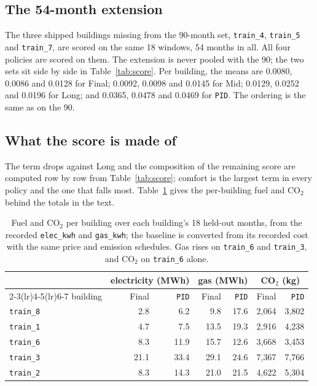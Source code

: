 \documentclass{article}
\begin{document}
\subsection{The 54-month extension}
\label{app:extension}

The three shipped buildings missing from the 90-month set, \texttt{train\_4}, \texttt{train\_5} and \texttt{train\_7}, are scored on the same 18 windows, 54 months in all. All four policies are scored on them. The extension is never pooled with the 90; the two sets sit side by side in Table~\ref{tab:score}. Per building, the means are 0.0080, 0.0086 and 0.0128 for Final; 0.0092, 0.0098 and 0.0145 for Mid; 0.0129, 0.0252 and 0.0196 for Long; and 0.0365, 0.0478 and 0.0469 for \texttt{PID}. The ordering is the same as on the 90.

\subsection{What the score is made of}
\label{app:fuel}

The term drops against Long and the composition of the remaining score are computed row by row from Table~\ref{tab:score}; comfort is the largest term in every policy and the one that falls most. Table~\ref{tab:app_fuel} gives the per-building fuel and CO$_2$ behind the totals in the text.

\begin{table}[h!]
\centering
\small
\begin{tabular}{@{}lrrrrrr@{}}
\toprule
 & \multicolumn{2}{c}{electricity (MWh)} & \multicolumn{2}{c}{gas (MWh)} & \multicolumn{2}{c}{CO$_2$ (kg)} \\
\cmidrule(lr){2-3}\cmidrule(lr){4-5}\cmidrule(lr){6-7}
building & Final & \texttt{PID} & Final & \texttt{PID} & Final & \texttt{PID} \\
\midrule
\texttt{train\_8} & 2.8 & 6.2 & 9.8 & 17.6 & 2{,}064 & 3{,}802 \\
\texttt{train\_1} & 4.7 & 7.5 & 13.5 & 19.3 & 2{,}916 & 4{,}238 \\
\texttt{train\_6} & 8.3 & 11.9 & 15.7 & 12.6 & 3{,}668 & 3{,}453 \\
\texttt{train\_3} & 21.1 & 33.4 & 29.1 & 24.6 & 7{,}367 & 7{,}766 \\
\texttt{train\_2} & 8.3 & 14.3 & 21.0 & 21.5 & 4{,}622 & 5{,}304 \\
\bottomrule
\end{tabular}
\vspace{4pt}
\caption{Fuel and CO$_2$ per building over each building's 18 held-out months, from the recorded \texttt{elec\_kwh} and \texttt{gas\_kwh}; the baseline is converted from its recorded cost with the same price and emission schedules. Gas rises on \texttt{train\_6} and \texttt{train\_3}, and CO$_2$ on \texttt{train\_6} alone.}
\label{tab:app_fuel}
\end{table}
\end{document}
